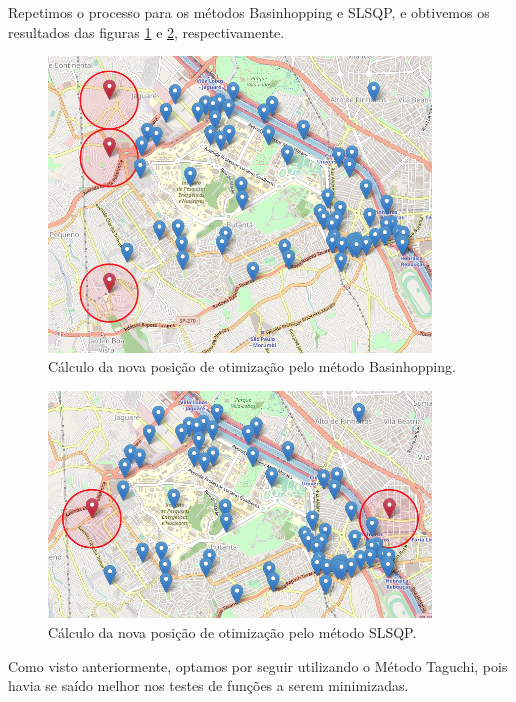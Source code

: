 \documentclass[]{politex}
\begin{document}
Repetimos o processo para os métodos Basinhopping e SLSQP, e obtivemos os
resultados das figuras \ref{fig:basinhopping_exemplo} e \ref{fig:slsqp_exemplo},
respectivamente.

\begin{figure}[H]
    \centering
    \includegraphics[width=4in]{imagens/basinhopping-exemplo}
    \caption{Cálculo da nova posição de otimização pelo método Basinhopping.}
    \label{fig:basinhopping_exemplo}
\end{figure}

\begin{figure}[H]
    \centering
    \includegraphics[width=4in]{imagens/slsqp-exemplo}
    \caption{Cálculo da nova posição de otimização pelo método SLSQP.}
    \label{fig:slsqp_exemplo}
\end{figure}

Como visto anteriormente, optamos por seguir utilizando o Método Taguchi, pois
havia se saído melhor nos testes de funções a serem minimizadas.

\end{document}
